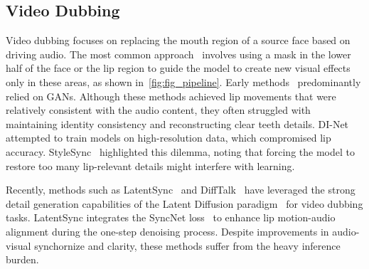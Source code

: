 \subsection{Video Dubbing}
\label{sec: rw_2}
Video dubbing focuses on replacing the mouth region of a source face based on driving audio. The most common approach~\cite{prajwal2020lip} involves using a mask in the lower half of the face or the lip region to guide the model to create new visual effects only in these areas, as shown in~\cref{fig:fig_pipeline}. 
Early methods~\cite{prajwal2020lip, zhang2023dinet, cheng2022videoretalking, wang2023seeing, guan2023stylesync, sun2022masked, zhong2023identity} predominantly relied on GANs. 
Although these methods achieved lip movements that were relatively consistent with the audio content, they often struggled with maintaining identity consistency and reconstructing clear teeth details. 
DI-Net~\cite{zhang2023dinet} attempted to train models on high-resolution data, which compromised lip accuracy. 
StyleSync~\cite{guan2023stylesync} highlighted this dilemma, noting that forcing the model to restore too many lip-relevant details might interfere with learning.

Recently, methods such as LatentSync~\cite{li2024latentsync} and DiffTalk~\cite{shen2023difftalk} have leveraged the strong detail generation capabilities of the Latent Diffusion paradigm~\cite{rombach2022high} for video dubbing tasks. 
LatentSync integrates the SyncNet loss~\cite{prajwal2020lip} to enhance lip motion-audio alignment during the one-step denoising process. 
Despite improvements in audio-visual synchornize and clarity, these methods suffer from the heavy inference burden.


